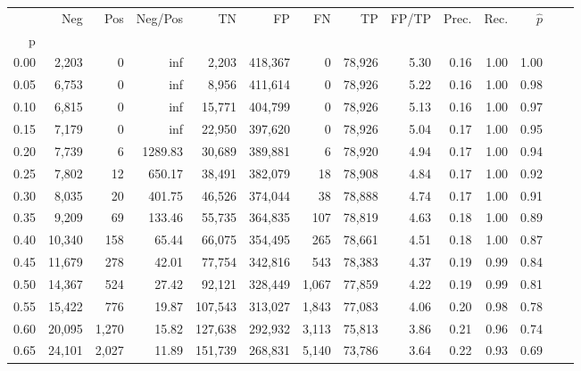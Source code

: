 \begin{tabular}{rrrrrrrrrrrrrr}
\toprule
{} &     Neg &     Pos &  Neg/Pos &       TN &       FP &      FN &      TP & FP/TP & Prec. &  Rec. & $\hat{p}$ \\
p    &         &         &          &          &          &         &         &       &       &       &           \\
\midrule
0.00 &   2,203 &       0 &      inf &    2,203 &  418,367 &       0 &  78,926 &  5.30 &  0.16 &  1.00 &      1.00 \\
0.05 &   6,753 &       0 &      inf &    8,956 &  411,614 &       0 &  78,926 &  5.22 &  0.16 &  1.00 &      0.98 \\
0.10 &   6,815 &       0 &      inf &   15,771 &  404,799 &       0 &  78,926 &  5.13 &  0.16 &  1.00 &      0.97 \\
0.15 &   7,179 &       0 &      inf &   22,950 &  397,620 &       0 &  78,926 &  5.04 &  0.17 &  1.00 &      0.95 \\
0.20 &   7,739 &       6 &  1289.83 &   30,689 &  389,881 &       6 &  78,920 &  4.94 &  0.17 &  1.00 &      0.94 \\
0.25 &   7,802 &      12 &   650.17 &   38,491 &  382,079 &      18 &  78,908 &  4.84 &  0.17 &  1.00 &      0.92 \\
0.30 &   8,035 &      20 &   401.75 &   46,526 &  374,044 &      38 &  78,888 &  4.74 &  0.17 &  1.00 &      0.91 \\
0.35 &   9,209 &      69 &   133.46 &   55,735 &  364,835 &     107 &  78,819 &  4.63 &  0.18 &  1.00 &      0.89 \\
0.40 &  10,340 &     158 &    65.44 &   66,075 &  354,495 &     265 &  78,661 &  4.51 &  0.18 &  1.00 &      0.87 \\
0.45 &  11,679 &     278 &    42.01 &   77,754 &  342,816 &     543 &  78,383 &  4.37 &  0.19 &  0.99 &      0.84 \\
0.50 &  14,367 &     524 &    27.42 &   92,121 &  328,449 &   1,067 &  77,859 &  4.22 &  0.19 &  0.99 &      0.81 \\
0.55 &  15,422 &     776 &    19.87 &  107,543 &  313,027 &   1,843 &  77,083 &  4.06 &  0.20 &  0.98 &      0.78 \\
0.60 &  20,095 &   1,270 &    15.82 &  127,638 &  292,932 &   3,113 &  75,813 &  3.86 &  0.21 &  0.96 &      0.74 \\
0.65 &  24,101 &   2,027 &    11.89 &  151,739 &  268,831 &   5,140 &  73,786 &  3.64 &  0.22 &  0.93 &      0.69 \\

\end{tabular}
